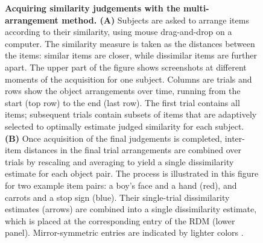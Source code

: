 \documentclass[
  authoryear]{elsarticle}
\begin{document}
\begin{figure}


\caption{\label{fig-multi-arrangement}\textbf{Acquiring similarity
judgements with the multi-arrangement method. (A)} Subjects are asked to
arrange items according to their similarity, using mouse drag-and-drop
on a computer. The similarity measure is taken as the distances between
the items: similar items are closer, while dissimilar items are further
apart. The upper part of the figure shows screenshots at different
moments of the acquisition for one subject. Columns are trials and rows
show the object arrangements over time, running from the start (top row)
to the end (last row). The first trial contains all items; subsequent
trials contain subsets of items that are adaptively selected to
optimally estimate judged similarity for each subject. \textbf{(B)} Once
acquisition of the final judgements is completed, inter-item distances
in the final trial arrangements are combined over trials by rescaling
and averaging to yield a single dissimilarity estimate for each object
pair. The process is illustrated in this figure for two example item
pairs: a boy's face and a hand (red), and carrots and a stop sign
(blue). Their single-trial dissimilarity estimates (arrows) are combined
into a single dissimilarity estimate, which is placed at the
corresponding entry of the RDM (lower panel). Mirror-symmetric entries
are indicated by lighter colors \citep[figure
from][]{murHumanObjectSimilarityJudgments2013}.}


\end{figure}
\end{document}

